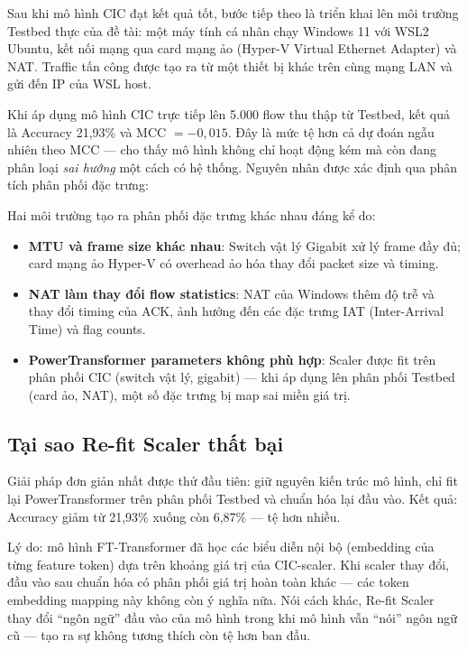 \documentclass[../DoAn.tex]{subfiles}
\begin{document}
Sau khi mô hình CIC đạt kết quả tốt, bước tiếp theo là triển khai lên môi trường Testbed thực của đề tài: một máy tính cá nhân chạy Windows 11 với WSL2 Ubuntu, kết nối mạng qua card mạng ảo (Hyper-V Virtual Ethernet Adapter) và NAT. Traffic tấn công được tạo ra từ một thiết bị khác trên cùng mạng LAN và gửi đến IP của WSL host.

Khi áp dụng mô hình CIC trực tiếp lên 5.000 flow thu thập từ Testbed, kết quả là Accuracy 21,93\% và MCC $= -0{,}015$. Đây là mức tệ hơn cả dự đoán ngẫu nhiên theo MCC --- cho thấy mô hình không chỉ hoạt động kém mà còn đang phân loại \textit{sai hướng} một cách có hệ thống. Nguyên nhân được xác định qua phân tích phân phối đặc trưng:

Hai môi trường tạo ra phân phối đặc trưng khác nhau đáng kể do:
\begin{itemize}
    \item \textbf{MTU và frame size khác nhau}: Switch vật lý Gigabit xử lý frame đầy đủ; card mạng ảo Hyper-V có overhead ảo hóa thay đổi packet size và timing.
    \item \textbf{NAT làm thay đổi flow statistics}: NAT của Windows thêm độ trễ và thay đổi timing của ACK, ảnh hưởng đến các đặc trưng IAT (Inter-Arrival Time) và flag counts.
    \item \textbf{PowerTransformer parameters không phù hợp}: Scaler được fit trên phân phối CIC (switch vật lý, gigabit) --- khi áp dụng lên phân phối Testbed (card ảo, NAT), một số đặc trưng bị map sai miền giá trị.
\end{itemize}

\subsection{Tại sao Re-fit Scaler thất bại}
\label{subsec:gd3-scaler}

Giải pháp đơn giản nhất được thử đầu tiên: giữ nguyên kiến trúc mô hình, chỉ fit lại PowerTransformer trên phân phối Testbed và chuẩn hóa lại đầu vào. Kết quả: Accuracy giảm từ 21,93\% xuống còn 6,87\% --- tệ hơn nhiều.

Lý do: mô hình FT-Transformer đã học các biểu diễn nội bộ (embedding của từng feature token) dựa trên khoảng giá trị của CIC-scaler. Khi scaler thay đổi, đầu vào sau chuẩn hóa có phân phối giá trị hoàn toàn khác --- các token embedding mapping này không còn ý nghĩa nữa. Nói cách khác, Re-fit Scaler thay đổi ``ngôn ngữ'' đầu vào của mô hình trong khi mô hình vẫn ``nói'' ngôn ngữ cũ --- tạo ra sự không tương thích còn tệ hơn ban đầu.
\end{document}
